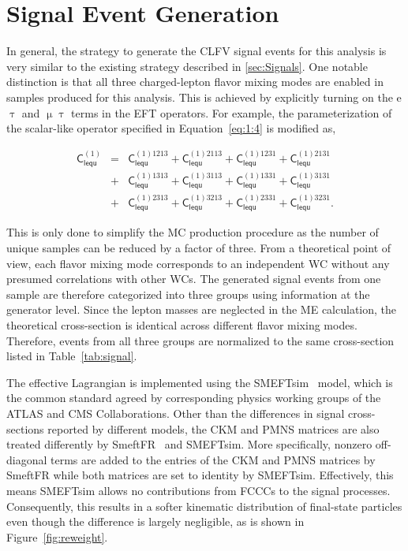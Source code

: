 \section{Signal Event Generation}
\label{sec:SigGen}

In general, the strategy to generate the \ac{CLFV} signal events for this analysis is very similar to the existing strategy described in \autoref{sec:Signals}. One notable distinction is that all three charged-lepton flavor mixing modes are enabled in samples produced for this analysis. This is achieved by explicitly turning on the e$\uptau$ and $\upmu\uptau$ terms in the \ac{EFT} operators. For example, the parameterization of the scalar-like operator specified in Equation~\ref{eq:1:4} is modified as,

\begin{eqnarray}
\textsf{C}_{\textsf{lequ}}^{(1)}  
 &=& \textsf{C}_{\textsf{lequ}}^{(1)1213}
 + \textsf{C}_{\textsf{lequ}}^{(1)2113}
 + \textsf{C}_{\textsf{lequ}}^{(1)1231}
 + \textsf{C}_{\textsf{lequ}}^{(1)2131} \nonumber\\
 &+& \textsf{C}_{\textsf{lequ}}^{(1)1313}
 + \textsf{C}_{\textsf{lequ}}^{(1)3113}
 + \textsf{C}_{\textsf{lequ}}^{(1)1331}
 + \textsf{C}_{\textsf{lequ}}^{(1)3131} \\
 &+& \textsf{C}_{\textsf{lequ}}^{(1)2313}
 + \textsf{C}_{\textsf{lequ}}^{(1)3213}
 + \textsf{C}_{\textsf{lequ}}^{(1)2331}
 + \textsf{C}_{\textsf{lequ}}^{(1)3231}. \nonumber
\label{eq:example}
\end{eqnarray}

This is only done to simplify the \ac{MC} production procedure as the number of unique samples can be reduced by a factor of three. From a theoretical point of view, each flavor mixing mode corresponds to an independent \ac{WC} without any presumed correlations with other \acp{WC}. The generated signal events from one sample are therefore categorized into three groups using information at the generator level. Since the lepton masses are neglected in the \ac{ME} calculation, the theoretical cross-section is identical across different flavor mixing modes. Therefore, events from all three groups are normalized to the same cross-section listed in Table~\ref{tab:signal}. 

The effective Lagrangian is implemented using the SMEFTsim~\cite{Brivio:2017btx} model, which is the common standard agreed by corresponding physics working groups of the \ac{ATLAS} and \ac{CMS} Collaborations. Other than the differences in signal cross-sections reported by different models, the \ac{CKM} and \ac{PMNS} matrices are also treated differently by SmeftFR~\cite{Dedes:2019uzs} and SMEFTsim. More specifically, nonzero off-diagonal terms are added to the entries of the \ac{CKM} and \ac{PMNS} matrices by SmeftFR while both matrices are set to identity by SMEFTsim. Effectively, this means SMEFTsim allows no contributions from \acp{FCCC} to the signal processes. Consequently, this results in a softer kinematic distribution of final-state particles even though the difference is largely negligible, as is shown in Figure~\ref{fig:reweight}.

